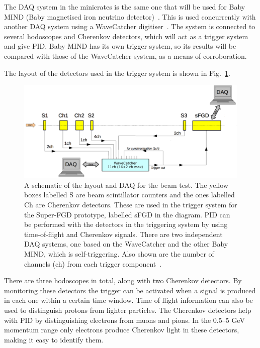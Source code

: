 \documentclass[aps,pra,12pt,notitlepage,tightenlines]{revtex4-1}
\begin{document}
The DAQ system in the minicrates is the same one that will be used for Baby MIND (Baby magnetised iron neutrino detector)~\cite{Antonova2017}. This is used concurrently with another DAQ system using a WaveCatcher digitiser~\cite{CAEN}. The system is connected to several hodoscopes and Cherenkov detectors, which will act as a trigger system and give PID. Baby MIND has its own trigger system, so its results will be compared with those of the WaveCatcher system, as a means of corroboration.

The layout of the detectors used in the trigger system is shown in Fig.~\ref{fig:daq}.
\begin{figure}
 \includegraphics[trim={1px 2px 1px 1px}, clip, scale=0.55]{daq2}
 \caption{A schematic of the layout and DAQ for the beam test. The yellow boxes labelled S are beam scintillator counters and the ones labelled Ch are Cherenkov detectors. These are used in the trigger system for the Super-FGD prototype, labelled sFGD in the diagram. PID can be performed with the detectors in the triggering system by using time-of-flight and Cherenkov signals. There are two independent DAQ systems, one based on the WaveCatcher and the other Baby MIND, which is self-triggering. Also shown are the number of channels (ch) from each trigger component~\cite{Korzenev2018}.}
 \label{fig:daq}
\end{figure}
There are three hodoscopes in total, along with two Cherenkov detectors. By monitoring these detectors the trigger can be activated when a signal is produced in each one within a certain time window. Time of flight information can also be used to distinguish protons from lighter particles. The Cherenkov detectors help with PID by distinguishing electrons from muons and pions. In the 0.5--5 GeV momentum range only electrons produce Cherenkov light in these detectors, making it easy to identify them.
\end{document}
